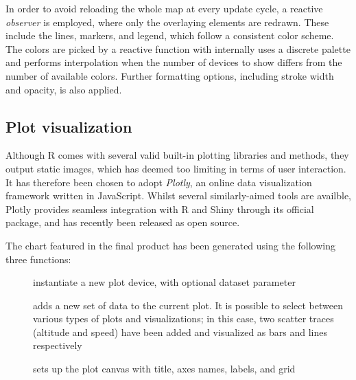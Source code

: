In order to avoid reloading the whole map at every update cycle, a reactive \emph{observer} is employed, where only the overlaying elements are redrawn.
These include the lines, markers, and legend, which follow a consistent color scheme.
The colors are picked by a reactive function with internally uses a discrete palette and performs interpolation when the number of devices to show differs from the number of available colors.
Further formatting options, including stroke width and opacity, is also applied.


\subsection{Plot visualization}
Although R comes with several valid built-in plotting libraries and methods, they output static images, which has deemed too limiting in terms of user interaction.
It has therefore been chosen to adopt \emph{Plotly}, an online data visualization framework written in JavaScript.
Whilst several similarly-aimed tools are availble, Plotly provides seamless integration with R and Shiny through its official package, and has recently been released as open source.

The chart featured in the final product has been generated using the following three functions:
\begin{description}
	\item[] instantiate a new plot device, with optional dataset parameter
	\item[] adds a new set of data to the current plot. It is possible to select between various types of plots and visualizations; in this case, two scatter traces (altitude and speed) have been added and visualized as bars and lines respectively
	\item[] sets up the plot canvas with title, axes names, labels, and grid
\end{description}
